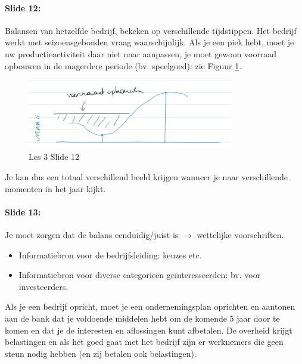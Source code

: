 \documentclass[10pt,a4paper]{report}
\begin{document}
\paragraph{Slide 12:} Balansen van hetzelfde bedrijf, bekeken op verschillende tijdstippen. Het bedrijf werkt met seizoensgebonden vraag waarschijnlijk. Als je een piek hebt, moet je uw productieactiviteit daar niet naar aanpassen, je moet gewoon voorraad opbouwen in de magerdere periode (bv. speelgoed): zie Figuur \ref{les03_02}.

\begin{figure}[h!]
\centering
\includegraphics[width=90mm]{Les03_02.png}
\caption{Les 3 Slide 12} 
\label{les03_02}
\end{figure}

Je kan dus een totaal verschillend beeld krijgen wanneer je naar verschillende momenten in het jaar kijkt. 

\paragraph{Slide 13:} Je moet zorgen dat de balans eenduidig/juist is $\rightarrow$ wettelijke voorschriften.
\begin{itemize}
\item Informatiebron voor de bedrijfsleiding: keuzes etc.
\item Informatiebron voor diverse categorie\"en ge\"interesseerden: bv. voor investeerders.
\end{itemize}
Als je een bedrijf opricht, moet je een ondernemingsplan oprichten en aantonen aan de bank dat je voldoende middelen hebt om de komende 5 jaar door te komen en dat je de interesten en aflossingen kunt afbetalen.
De overheid krijgt belastingen en als het goed gaat met het bedrijf zijn er werknemers die geen steun nodig hebben (en zij betalen ook belastingen).
\end{document}
